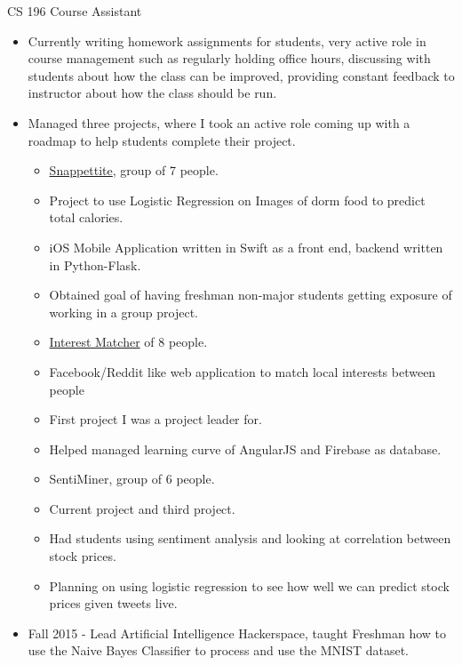 \documentclass{tccv}
\begin{document}
\begin{eventlist}

  {CS 196}
  {Course Assistant}

  \begin{itemize}
  \item Currently writing homework assignments for students, very active role in course management such as regularly holding office hours, discussing with students about how the class can be improved, providing constant feedback to instructor about how the class should be run.
  \item Managed three projects, where I took an active role coming up with a roadmap to help students complete their project.
    \begin{itemize}
    \item \href{https://github.com/SNAPPETITE}{Snappettite}, group of 7 people.
    \item Project to use Logistic Regression on Images of dorm food to predict total calories.
    \item iOS Mobile Application written in Swift as a front end, backend written in Python-Flask.
    \item Obtained goal of having freshman non-major students getting exposure of working in a group project.
    \end{itemize}
    \begin{itemize}
    \item \href{https://github.com/InterestMatcher}{Interest Matcher} of 8 people.
    \item Facebook/Reddit like web application to match local interests between people
    \item First project I was a project leader for.
    \item Helped managed learning curve of AngularJS and Firebase as database.
    \end{itemize}
    \begin{itemize}
    \item SentiMiner, group of 6 people.
    \item Current project and third project.
    \item Had students using sentiment analysis and looking at correlation between stock prices.
    \item Planning on using logistic regression to see how well we can predict stock prices given tweets live.
    \end{itemize}
  \item Fall 2015 - Lead Artificial Intelligence Hackerspace, taught Freshman how to use the Naive Bayes Classifier to process and use the MNIST dataset.
  \end{itemize}


\end{eventlist}
\end{document}
